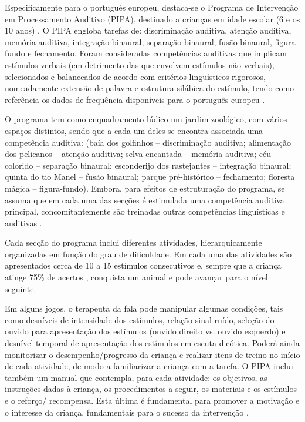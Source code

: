 \documentclass[output=paper,colorlinks,citecolor=brown,booklanguage=portuguese]{langscibook}
\begin{document}
Especificamente para o português europeu, destaca-se o Programa de Intervenção em Processamento Auditivo (PIPA), destinado a crianças em idade escolar (6 e os 10 anos) \citep{Luis2019, Abrantes2019}. O PIPA engloba tarefas de: discriminação auditiva, atenção auditiva, memória auditiva, integração binaural, separação binaural, fusão binaural, figura-fundo e fechamento. Foram consideradas competências auditivas que implicam estímulos verbais (em detrimento das que envolvem estímulos não-verbais), selecionados e balanceados de acordo com critérios linguísticos rigorosos, nomeadamente extensão de palavra e estrutura silábica do estímulo, tendo como referência os dados de frequência disponíveis para o português europeu \citep{Guerreiro2007, Vigario2006}.

O programa tem como enquadramento lúdico um jardim zoológico, com vários espaços distintos, sendo que a cada um deles se encontra associada uma competência auditiva: (baía dos golfinhos – discriminação auditiva; alimentação dos pelicanos – atenção auditiva; selva encantada – memória auditiva; céu colorido – separação binaural; esconderijo dos rastejantes – integração binaural;  quinta do tio Manel – fusão binaural; parque pré-histórico – fechamento; floresta mágica – figura-fundo). Embora, para efeitos de estruturação do programa, se assuma que em cada uma das secções é estimulada uma competência auditiva principal, concomitantemente são treinadas outras competências linguísticas e auditivas \citep{Magimairaj2018}.

Cada secção do programa inclui diferentes atividades, hierarquicamente organizadas em função do grau de dificuldade. Em cada uma das atividades são apresentados cerca de 10 a 15 estímulos consecutivos e, sempre que a criança atinge 75\% de acertos \citep{Weihing2015}, conquista um animal e pode avançar para o nível seguinte. 

Em alguns jogos, o terapeuta da fala pode manipular algumas condições, tais como desníveis de intensidade dos estímulos, relação sinal-ruído, seleção do ouvido para apresentação dos estímulos (ouvido direito vs. ouvido esquerdo) e desnível temporal de apresentação dos estímulos em escuta dicótica. Poderá ainda monitorizar o desempenho/progresso da criança e realizar itens de treino no início de cada atividade, de modo a familiarizar a criança com a tarefa. O PIPA inclui também um manual que contempla, para cada atividade: os objetivos, as instruções dadas à criança, os procedimentos a seguir, os materiais e os estímulos e o reforço/ recompensa. Esta última é fundamental para promover a motivação e o interesse da criança, fundamentais para o sucesso da intervenção \citep{Stroiek2015}.
\end{document}
